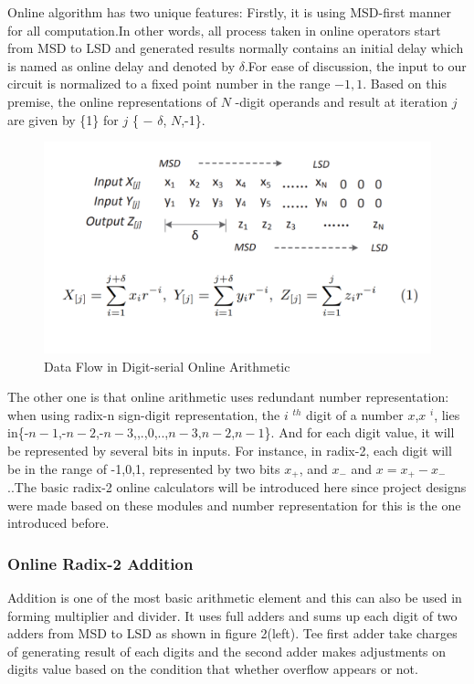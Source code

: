 \documentclass[10pt]{article}
\begin{document}
Online algorithm has two unique features: Firstly, it is using MSD-first manner for all computation.In other words, all process taken in online operators start from MSD to LSD and generated results normally contains an initial delay which is named as online delay and denoted by $\delta$.For ease of discussion, the input to our circuit is normalized to a fixed point number in the range \(−1, 1\). Based on this premise, the online representations of $N$ -digit operands and result at iteration $j$ are given by \{1\} for $j$  \{ $-$ $\delta$, $N$,-1\}\cite{c2}.
    
        \begin{figure}[H]
       \centering
       \includegraphics[scale=0.4]{f1.png}
       \caption{Data Flow in Digit-serial Online Arithmetic}
    \end{figure}
The other one is that online arithmetic uses redundant number representation\cite{c2}: when using radix-n sign-digit representation, the $i$ $^{th}$ digit of a number $x$,$x$ $^i$, lies in\{-\(n-1\),-\(n-2\),-\(n-3\),,.,0,..,\(n-3\),\(n-2\),\(n-1\)\}. And for each digit value, it will be represented by several bits in inputs. For instance, in radix-2, each digit will be in the range of -1,0,1, represented by two bits $x_+$, and $x_-$ and $x = x_+-x_-$.\cite{c4}.The basic radix-2 online calculators will be introduced here since project designs were made based on these modules and number representation for this is the one introduced before.
    
\subsubsection{Online Radix-2 Addition \cite{c2}}

Addition is one of the most basic arithmetic element and this can also be used in forming multiplier and divider. It uses full adders and sums up each digit of two adders from MSD to LSD as shown in figure 2(left). Tee first adder take charges of generating result of each digits and the second adder makes adjustments on digits value based on the condition that whether overflow appears or not.
\end{document}
